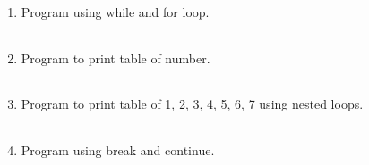 \documentclass{exam}
\begin{document}
\begin{enumerate}
   \item  Program  using while and for loop.

   \begin{myTableStyle}
   \begin{center} \begin{tabular}{ |m{14cm}| } \hline
              \\ \hline
    \end{tabular} \end{center}
\end{myTableStyle}
  \pagebreak

   \item  Program  to print table of number.

   \begin{myTableStyle}
   \begin{center} \begin{tabular}{ |m{14cm}| } \hline
              \\ \hline
    \end{tabular} \end{center}
\end{myTableStyle}
  \pagebreak

   \item  Program  to print table of 1, 2, 3, 4, 5, 6, 7 using nested loops.

   \begin{myTableStyle}
   \begin{center} \begin{tabular}{ |m{14cm}| } \hline
              \\ \hline
    \end{tabular} \end{center}
\end{myTableStyle}
  \pagebreak

   \item  Program  using break and continue.

   \begin{myTableStyle}
   \begin{center} \begin{tabular}{ |m{14cm}| } \hline
              \\ \hline
    \end{tabular} \end{center}
\end{myTableStyle}
  \pagebreak


\end{enumerate}
\end{document}

